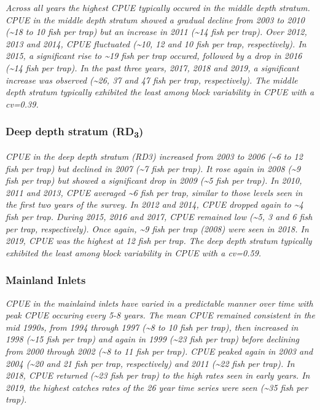 \documentclass[12pt]{article}\usepackage[]{graphicx}\usepackage[]{color}
\begin{document}
\emph{Across all years the highest CPUE typically occured in the middle depth stratum. CPUE in the middle depth stratum showed a gradual decline from 2003 to 2010 (\textasciitilde18 to 10 fish per trap) but an increase in 2011 (\textasciitilde14 fish per trap). Over 2012, 2013 and 2014, CPUE fluctuated (\textasciitilde10, 12 and 10 fish per trap, respectively). In 2015, a significant rise to \textasciitilde19 fish per trap occured, followed by a drop in 2016 (\textasciitilde14 fish per trap). In the past three years, 2017, 2018 and 2019, a significant increase was observed (\textasciitilde26, 37 and 47 fish per trap, respectively). The middle depth stratum typically exhibited the least among block variability in CPUE with a cv=0.39.}

\hypertarget{deep-depth-stratum-rd3}{%
\subsubsection{\texorpdfstring{Deep depth stratum (RD\textsubscript{3})}{Deep depth stratum (RD3)}}\label{deep-depth-stratum-rd3}}

\emph{CPUE in the deep depth stratum (RD3) increased from 2003 to 2006 (\textasciitilde6 to 12 fish per trap) but declined in 2007 (\textasciitilde7 fish per trap). It rose again in 2008 (\textasciitilde9 fish per trap) but showed a significant drop in 2009 (\textasciitilde5 fish per trap). In 2010, 2011 and 2013, CPUE averaged \textasciitilde6 fish per trap, similar to those levels seen in the first two years of the survey. In 2012 and 2014, CPUE dropped again to \textasciitilde4 fish per trap. During 2015, 2016 and 2017, CPUE remained low (\textasciitilde5, 3 and 6 fish per trap, respectively). Once again, \textasciitilde9 fish per trap (2008) were seen in 2018. In 2019, CPUE was the highest at 12 fish per trap. The deep depth stratum typically exhibited the least among block variability in CPUE with a cv=0.59.}

\hypertarget{mainland-inlets}{%
\subsubsection{Mainland Inlets}\label{mainland-inlets}}

\emph{CPUE in the mainlaind inlets have varied in a predictable manner over time with peak CPUE occuring every 5-8 years. The mean CPUE remained consistent in the mid 1990s, from 1994 through 1997 (\textasciitilde8 to 10 fish per trap), then increased in 1998 (\textasciitilde15 fish per trap) and again in 1999 (\textasciitilde23 fish per trap) before declining from 2000 through 2002 (\textasciitilde8 to 11 fish per trap). CPUE peaked again in 2003 and 2004 (\textasciitilde20 and 21 fish per trap, respectively) and 2011 (\textasciitilde22 fish per trap). In 2018, CPUE returned (\textasciitilde23 fish per trap) to the high rates seen in early years. In 2019, the highest catches rates of the 26 year time series were seen (\textasciitilde35 fish per trap).}
\end{document}
